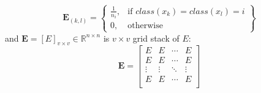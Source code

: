 \begin{appendix}
    \begin{equation}
        \boldsymbol{E}_{(k,l)} = \left\{\begin{array}{lr}
            \frac{1}{n_i}, & \text{if } class(x_k) = class(x_l) = i\\
            0, & \text{otherwise}
            \end{array}\right\}
    \end{equation}
    and $\boldsymbol{E} = \left[E\right]_{v\times v} \in \mathbb{R}^{n\times n}$ is $v \times v$ grid stack of $E$:
    \begin{equation}
        \boldsymbol{E} = \left[\begin{matrix}E&E&\cdots&E\\E&E&\cdots&E\\\vdots&\vdots&\ddots&\vdots\\E&E&\cdots&E\\\end{matrix}\right]
    \end{equation}


\end{appendix}

